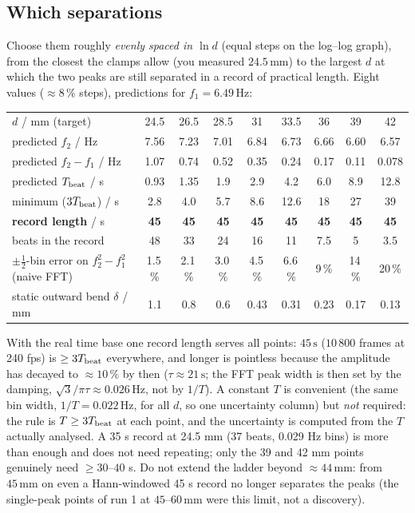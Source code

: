 \documentclass[11pt,a4paper]{article}
\newcommand{\un}[1]{\,\mathrm{#1}}
\begin{document}
\subsection*{Which separations}
Choose them roughly \emph{evenly spaced in $\ln d$} (equal steps on the log--log graph), from the closest the clamps allow (you measured $24.5\un{mm}$) to the largest $d$ at which the two peaks are still separated in a record of practical length. Eight values ($\approx8\,\%$ steps), predictions for $f_1=6.49\un{Hz}$:
\begin{center}\small
\begin{tabular}{@{}lcccccccc@{}}
\toprule
$d$ / mm (target) & 24.5 & 26.5 & 28.5 & 31 & 33.5 & 36 & 39 & 42\\
predicted $f_2$ / Hz & 7.56 & 7.23 & 7.01 & 6.84 & 6.73 & 6.66 & 6.60 & 6.57\\
predicted $f_2-f_1$ / Hz & 1.07 & 0.74 & 0.52 & 0.35 & 0.24 & 0.17 & 0.11 & 0.078\\
predicted $T_{\rm beat}$ / s & 0.93 & 1.35 & 1.9 & 2.9 & 4.2 & 6.0 & 8.9 & 12.8\\
minimum ($3T_{\rm beat}$) / s & 2.8 & 4.0 & 5.7 & 8.6 & 12.6 & 18 & 27 & 39\\
\textbf{record length} / s & \textbf{45} & \textbf{45} & \textbf{45} & \textbf{45} & \textbf{45} & \textbf{45} & \textbf{45} & \textbf{45}\\
beats in the record & 48 & 33 & 24 & 16 & 11 & 7.5 & 5 & 3.5\\
$\pm\frac12$-bin error on $f_2^2-f_1^2$ (naive FFT) & 1.5\,\% & 2.1\,\% & 3.0\,\% & 4.5\,\% & 6.6\,\% & 9\,\% & 14\,\% & 20\,\%\\
static outward bend $\delta$ / mm & 1.1 & 0.8 & 0.6 & 0.43 & 0.31 & 0.23 & 0.17 & 0.13\\
\bottomrule
\end{tabular}
\end{center}
With the real time base one record length serves all points: $45\un{s}$ ($10\,800$ frames at 240 fps) is $\ge3T_{\rm beat}$ everywhere, and longer is pointless because the amplitude has decayed to $\approx10\,\%$ by then ($\tau\approx21\un{s}$; the FFT peak width is then set by the damping, $\sqrt3/\pi\tau\approx0.026\un{Hz}$, not by $1/T$). A constant $T$ is convenient (the same bin width, $1/T=0.022\un{Hz}$, for all $d$, so one uncertainty column) but \emph{not} required: the rule is $T\ge3T_{\rm beat}$ at each point, and the uncertainty is computed from the $T$ actually analysed. A 35 s record at 24.5 mm (37 beats, 0.029 Hz bins) is more than enough and does not need repeating; only the 39 and 42 mm points genuinely need $\ge30$--$40$ s. Do not extend the ladder beyond $\approx44\un{mm}$: from $45\un{mm}$ on even a Hann-windowed 45 s record no longer separates the peaks (the single-peak points of run 1 at $45$--$60\un{mm}$ were this limit, not a discovery).
\end{document}
